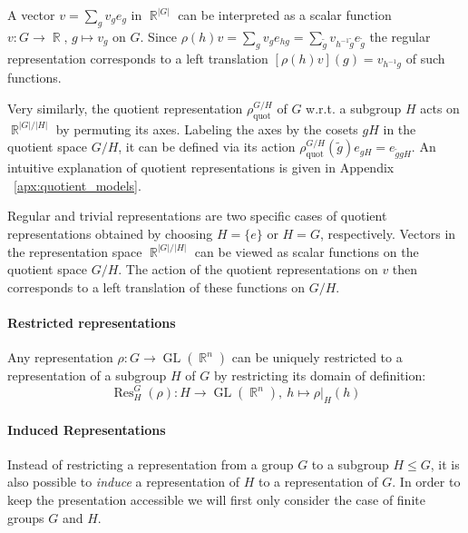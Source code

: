 \documentclass{article}
\newcommand{\apx}{Appendix\xspace
}
\DeclareMathOperator*{\R}{\mathbb{R}}
\newcommand{\GL}[1]{\ensuremath{\operatorname{GL}(#1)}}
\newcommand{\Res}[2]{\ensuremath{\operatorname{Res}_{#1}^{#2}}}
\begin{document}
A vector $v=\sum_g v_g e_g$ in $\R^{|G|}$ can be interpreted as a scalar function $v:G\to\R,\,g\mapsto v_g$ on $G$.
Since $\rho(h)v = \sum_g v_g e_{hg} = \sum_{\tilde{g}} v_{h^{-1}\tilde{g}} e_{\tilde{g}}$ the regular representation corresponds to a left translation $[\rho(h)v](g)=v_{h^{-1}g}$ of such functions.

Very similarly, the quotient representation $\rho_\text{quot}^{G/H}$ of $G$ w.r.t. a subgroup $H$ acts on $\R^{|G|/|H|}$ by permuting its axes.
Labeling the axes by the cosets $gH$ in the quotient space $G/H$, it can be defined via its action $\rho_\text{quot}^{G/H}(\tilde{g})e_{gH}=e_{\tilde{g}gH}$.
An intuitive explanation of quotient representations is given in \apx~\ref{apx:quotient_models}.

Regular and trivial representations are two specific cases of quotient representations obtained by choosing $H=\{e\}$ or $H=G$, respectively.
Vectors in the representation space $\R^{|G|/|H|}$ can be viewed as scalar functions on the quotient space $G/H$.
The action of the quotient representations on $v$ then corresponds to a left translation of these functions on $G/H$.



\paragraph{Restricted representations}

Any representation $\rho:G\to\GL{\R^n}$ can be uniquely restricted to a representation of a subgroup $H$ of $G$ by restricting its domain of definition:
\[
    \Res{H}{G}(\rho): H \to \GL{{\R}^n},\ h\mapsto\rho\big|_H(h)
\]


\paragraph{Induced Representations}

Instead of restricting a representation from a group $G$ to a subgroup $H\leq G$, it is also possible to \textit{induce} a representation of $H$ to a representation of $G$.
In order to keep the presentation accessible we will first only consider the case of finite groups $G$ and $H$.
\end{document}

